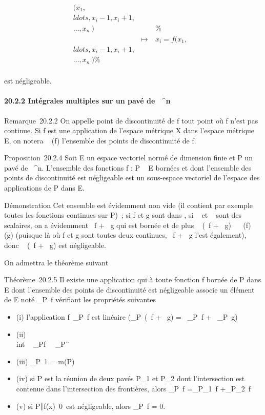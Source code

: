 \documentclass[]{article}
\begin{document}
\begin{align*}
(x_1,\\ldots,x_i-1,x_i+1,\\\ldots,x_n~)&&
\%& \\ & \mapsto~&
x_i =
f(x_1,\\ldots,x_i-1,x_i+1,\\\ldots,x_n~)\%&
\\ \end{align*}

est négligeable.

\paragraph{20.2.2 Intégrales multiples sur un pavé de ~^n}

Remarque~20.2.2 On appelle point de discontinuité de f tout point où f
n'est pas continue. Si f est une application de l'espace métrique X dans
l'espace métrique E, on notera
\mathrmDisc~ (f) l'ensemble
des points de discontinuité de f.

Proposition~20.2.4 Soit E un espace vectoriel normé de dimension finie
et P un pavé de ~^n. L'ensemble  des fonctions f : P \rightarrow~ E
bornées et dont l'ensemble des points de discontinuité est négligeable
est un sous-espace vectoriel de l'espace des applications de P dans E.

Démonstration Cet ensemble est évidemment non vide (il contient par
exemple toutes les fonctions continues sur P)~; si f et g sont dans ,
si \alpha~ et \beta~ sont des scalaires, on a évidemment \alpha~f + \beta~g qui est bornée et
de plus \mathrmDisc~ (\alpha~f +
\beta~g) \subset~\mathrmDisc~ (f)
\cup\mathrmDisc~ (g) (puisque
là où f et g sont toutes deux continues, \alpha~f + \beta~g l'est également), donc
\mathrmDisc~ (\alpha~f + \beta~g) est
négligeable.

On admettra le théorème suivant

Théorème~20.2.5 Il existe une application qui à toute fonction f bornée
de P dans E dont l'ensemble des points de discontinuité est négligeable
associe un élément de E noté \int  _P~f
vérifiant les propriétés suivantes

\begin{itemize}
\itemsep1pt\parskip0pt
\item
  (i) l'application
  f\mapsto~\int  _P~f
  est linéaire (\int  _P~(\alpha~f + \beta~g) =
  \alpha~\int  _P~f +
  \beta~\int  _P~g)
\item
  (ii) \\int ~
  _Pf\ \leq\int ~
  _P\f\
\item
  (iii) \int  _P~1 = m(P)
\item
  (iv) si P est la réunion de deux pavés P_1 et P_2
  dont l'intersection est contenue dans l'intersection des frontières,
  alors \int  _P~f
  =\int  _P_1~f
  +\int  _P_2~f
\item
  (v) si \x \in
  P∣f(x)\mathrel\neq~0\
  est négligeable, alors \int  _P~f = 0.
\end{itemize}
\end{document}

